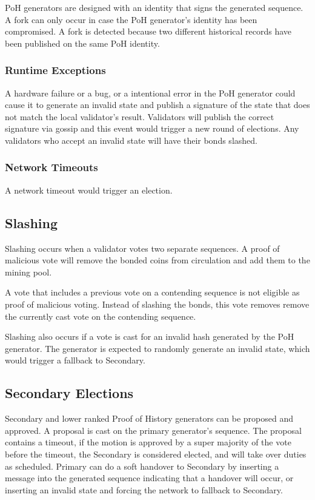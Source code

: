 \documentclass[12pt]{article}
\begin{document}
PoH generators are designed with an identity that signs the generated sequence. A fork can only occur in case the PoH generator’s identity has been compromised. A fork is detected because two different historical records have been published on the same PoH identity.

\subsubsection{Runtime Exceptions}
A hardware failure or a bug, or a intentional error in the PoH generator could cause it to generate an invalid state and publish a signature of the state that does not match the local validator’s result. Validators will publish the correct signature via gossip and this event would trigger a new round of elections. Any validators who accept an invalid state will have their bonds slashed.

\subsubsection{Network Timeouts}

A network timeout would trigger an election.

\subsection{Slashing}
Slashing occurs when a validator votes two separate sequences. A proof of malicious vote will remove the bonded coins from circulation and add them to the mining pool.

A vote that includes a previous vote on a contending sequence is not eligible as proof of malicious voting. Instead of slashing the bonds, this vote removes remove the currently cast vote on the contending sequence.

Slashing also occurs if a vote is cast for an invalid hash generated by the PoH generator. The generator is expected to randomly generate an invalid state, which would trigger a fallback to Secondary.
\subsection{Secondary Elections}
Secondary and lower ranked Proof of History generators can be proposed and approved. A proposal is cast on the primary generator’s sequence. The proposal contains a timeout, if the motion is approved by a super majority of the vote before the timeout, the Secondary is considered elected, and will take over duties as scheduled. Primary can do a soft handover to Secondary by inserting a message into the generated sequence indicating that a handover will occur, or inserting an invalid state and forcing the network to fallback to Secondary.
\end{document}

